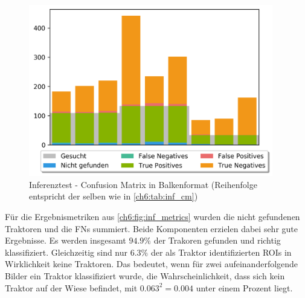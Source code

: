\begin{figure}[ht]
    \begin{small}
        \begin{center}
            \includegraphics[width=0.95\textwidth]{figures/chapter_6/inference-cmbars}
        \end{center}
        \caption[Inferenztest - Confusion Matrix in Balkenformat]
        {Inferenztest - Confusion Matrix in Balkenformat (Reihenfolge entspricht der selben wie in \autoref{ch6:tab:inf_cm})}
        \label{ch6:fig:inf_cm}
    \end{small}
\end{figure}

Für die Ergebnismetriken aus \autoref{ch6:fig:inf_metrics} wurden die nicht gefundenen Traktoren und die \acp{FN} summiert.
Beide Komponenten erzielen dabei sehr gute Ergebnisse.
Es werden insgesamt $94.9 \%$ der Trakoren gefunden und richtig klassifiziert.
Gleichzeitig sind nur $6.3 \%$ der als Traktor identifizierten \acp{ROI} in Wirklichkeit keine Traktoren.
Das bedeutet, wenn für zwei aufeinanderfolgende Bilder ein Traktor klassifiziert wurde, die Wahrscheinlichkeit, dass sich kein Traktor auf der Wiese befindet, mit $0.063^2=0.004$ unter einem Prozent liegt.

